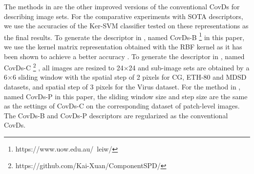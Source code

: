 \documentclass[review]{elsarticle}
\begin{document}
	The methods in \cite{wang2015beyond,li2016spatial,chen2018Component} are the other improved versions of the conventional CovDs for describing image sets. For the comparative experiments with SOTA descriptors, we use the accuracies of the Ker-SVM classifier tested on these representations as the final results. To generate the descriptor in \cite{wang2015beyond}, named CovDs-B \footnote{https://www.uow.edu.au/~leiw/} in this paper, we use the kernel matrix representation obtained with  the RBF kernel as it has been shown to achieve a better accuracy \cite{wang2015beyond}. To generate the descriptor in \cite{chen2018Component}, named CovDs-C \footnote{https://github.com/Kai-Xuan/ComponentSPD/} , all images are resized to 24$\times$24 and sub-image sets are obtained by a 6$\times$6 sliding window with the spatial step of 2 pixels for CG, ETH-80 and MDSD datasets, and spatial step of 3 pixels for the Virus dataset. For the method in \cite{li2016spatial}, named CovDs-P in this paper, the sliding window size and step size are the same as the settings of CovDs-C on the corresponding dataset of patch-level images. The CovDs-B \cite{wang2015beyond} and CovDs-P \cite{li2016spatial} descriptors are regularized  as the conventional CovDs.\\
\end{document}
